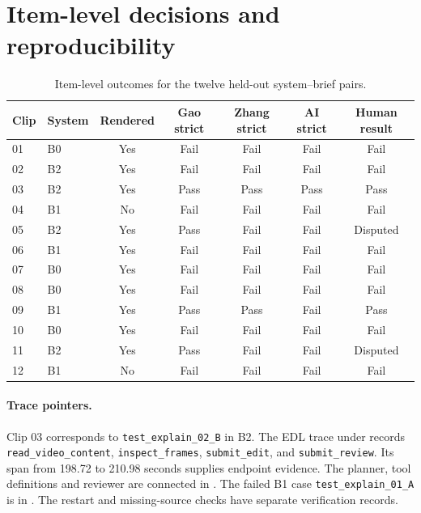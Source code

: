 \section{Item-level decisions and reproducibility}
\label{sec:appendix}

\begin{table}[htbp]
\centering
\caption{Item-level outcomes for the twelve held-out system--brief pairs.}
\label{tab:cases}
\begin{tabular*}{\linewidth}{@{\extracolsep{\fill}}llccccc}
\toprule
Clip & System & Rendered & Gao strict & Zhang strict & AI strict & Human result \\
\midrule
01 & B0 & Yes & Fail & Fail & Fail & Fail \\
02 & B2 & Yes & Fail & Fail & Fail & Fail \\
03 & B2 & Yes & Pass & Pass & Pass & Pass \\
04 & B1 & No & Fail & Fail & Fail & Fail \\
05 & B2 & Yes & Pass & Fail & Fail & Disputed \\
06 & B1 & Yes & Fail & Fail & Fail & Fail \\
07 & B0 & Yes & Fail & Fail & Fail & Fail \\
08 & B0 & Yes & Fail & Fail & Fail & Fail \\
09 & B1 & Yes & Pass & Pass & Fail & Pass \\
10 & B0 & Yes & Fail & Fail & Fail & Fail \\
11 & B2 & Yes & Pass & Fail & Fail & Disputed \\
12 & B1 & No & Fail & Fail & Fail & Fail \\
\bottomrule
\end{tabular*}
\end{table}

\paragraph{Trace pointers.}
Clip 03 corresponds to \texttt{test\_explain\_02\_B} in B2. The EDL trace under  records \texttt{read\_video\_content}, \texttt{inspect\_frames}, \texttt{submit\_edit}, and \texttt{submit\_review}. Its span from 198.72 to 210.98 seconds supplies endpoint evidence. The planner, tool definitions and reviewer are connected in . The failed B1 case \texttt{test\_explain\_01\_A} is in . The restart and missing-source checks have separate verification records.

